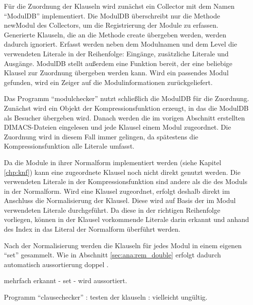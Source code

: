 Für die Zuordnung der Klauseln wird zunächst ein Collector mit dem Namen "`ModulDB"' implementiert. Die ModulDB überschreibt nur die Methode newModul des Collectors,
um die Registrierung der Module zu erfassen. Generierte Klauseln, die an die Methode create übergeben werden, werden dadurch ignoriert. Erfasst werden neben dem
Modulnamen und dem Level die verwendeten Literale in der Reihenfolge: Eingänge, zusätzliche Literale und Ausgänge. ModulDB stellt außerdem eine Funktion bereit,
der eine beliebige Klausel zur Zuordnung übergeben werden kann. Wird ein passendes Modul gefunden, wird ein Zeiger auf die Modulinformationen zurückgeliefert.

Das Programm "`modulchecker"' nutzt schließlich die ModulDB für die Zuordnung. Zunächst wird ein Objekt der Kompressionsfunktion erzeugt, in das die ModulDB als
Besucher übergeben wird. Danach werden die im vorigen Abschnitt erstellten DIMACS-Dateien eingelesen und jede Klausel einem Modul zugeordnet. Die Zuordnung wird
in diesem Fall immer gelingen, da spätestens die Kompressionsfunktion alle Literale umfasst.

Da die Module in ihrer Normalform implementiert werden (siehe Kapitel \ref{chp:knf}) kann eine zugeordnete Klausel noch nicht direkt genutzt werden.
Die verwendeten Literale in der Kompressionsfunktion sind andere als die des Moduls in der Normalform. Wird eine Klausel zugeordnet, erfolgt deshalb
direkt im Anschluss die Normalisierung der Klausel. Diese wird auf Basis der im Modul verwendeten Literale durchgeführt. Da diese in der richtigen
Reihenfolge vorliegen, können in der Klausel vorkommende Literale darin erkannt und anhand des Index in das Literal der Normalform überführt werden.

Nach der Normalisierung werden die Klauseln für jedes Modul in einem eigenen "`set"' gesammelt. Wie in Abschnitt \ref{sec:ana:rem_double} erfolgt
dadurch automatisch aussortierung doppel .

mehrfach erkannt - set - wird aussortiert.


Programm "`clausechecker"' : testen der klauseln : vielleicht ungültig.


